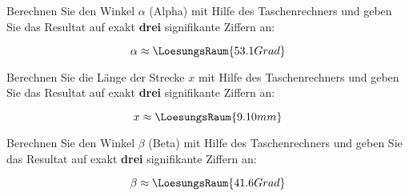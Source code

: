 

\begin{frage}[1]
 Berechnen Sie den Winkel $\alpha$ (Alpha) mit Hilfe des Taschenrechners
 und geben Sie das Resultat auf exakt \textbf{drei} signifikante Ziffern an:
\begin{center}
\end{center}

$$\alpha \approx \LoesungsRaum{53.1 Grad}$$
  
\end{frage}


\begin{frage}[1]
 Berechnen Sie die Länge der Strecke $x$ mit Hilfe des Taschenrechners
 und geben Sie das Resultat auf exakt \textbf{drei} signifikante Ziffern an:
\begin{center}
\end{center}

$$x \approx \LoesungsRaum{ 9.10 mm}$$

\end{frage}
  
  

%
%  
  

\begin{frage}[1]
 Berechnen Sie den Winkel $\beta$ (Beta) mit Hilfe des Taschenrechners
 und geben Sie das Resultat auf exakt \textbf{drei} signifikante Ziffern an:
\begin{center}
\end{center}

$$\beta \approx \LoesungsRaum{41.6 Grad}$$
  
\end{frage}
  
